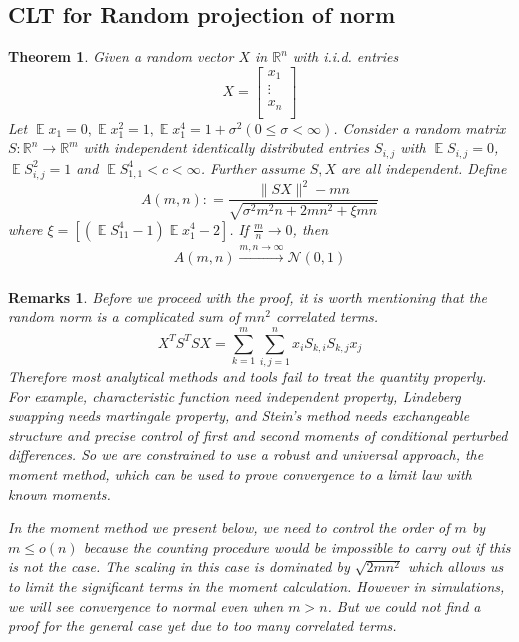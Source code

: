 \documentclass[12pt]{extarticle}
\newtheorem{theorem}{Theorem}
\newtheorem*{remark*}{Remarks}
\newcommand{\cN}{{\mathcal{N}}}
\newcommand{\field}[1]{\mathbb{#1}}
\newcommand{\R}{\field{R}}
\newcommand{\1}{\field{1}}
\DeclareMathOperator{\E}{\mathbb{E}}
\newcommand{\mat}[2][rrrrrrrrrrrrrrrrrrrrrrrrrrrrrrrr]{\left[ \begin{array}{#1} #2 \\ \end{array}\right]}
\numberwithin{equation}{section}
\begin{document}
\subsection{CLT for Random projection of norm}
\begin{theorem}
\label{thm:rand_proj norm CLT}
Given a random vector $X$ in $\R^n$ with i.i.d. entries
$$X=\mat[c]{x_1\\ \vdots\\ x_n}$$
Let $\E x_1=0, \E x_1^2=1, \E x_1^4 =1+\sigma^2 (0\le \sigma <\infty)$.
Consider a  random  matrix $S: \R^n \to \R^m$ with independent identically distributed entries $S_{i,j}$ with $ \E S_{i,j} = 0$,  $ \E S_{i,j}^2 = 1$ and $\E S_{1,1}^4<c<\infty$.
Further assume $S,X$ are all independent.
Define 
\[
    A(m,n): =\frac{\|SX\|^2 - mn}{\sqrt{\sigma^2 m^2n+2mn^2+ \xi mn}}
\]
where $\xi=[(\E S_{11}^4-1)\E x_1^4 -2]$. If $\frac{m}{n} \to 0$, then
\begin{align}
 A(m,n)\xrightarrow[]{m,n \to \infty} \cN(0,1) \label{eqn:rand_proj norm CLT}
\end{align}

\end{theorem}
\begin{remark*}
Before we proceed with the proof, it is worth mentioning that the random norm is a complicated sum of $mn^2$ correlated terms.
\[
X^TS^TSX = \sum_{k=1}^m\sum_{i,j=1}^n x_i S_{k,i} S_{k,j}x_j
\]
Therefore most analytical methods and tools fail to treat the quantity properly. For example,  characteristic function need independent property, Lindeberg swapping needs martingale property, and Stein's method needs exchangeable structure and precise control of first and second moments of conditional perturbed differences. So we are constrained to use a robust and universal approach, the moment method, which can be used to prove convergence to a limit law with known moments.

In the moment method we present below, we need to control the order of $m$ by $m \le o(n)$ because the counting procedure would be impossible to carry out if this is not the case. The scaling in this case is dominated by $\sqrt{2mn^2}$ which allows us to limit the significant terms in the moment calculation. However in simulations, we will see convergence to normal even when $m> n$. But we could not find a proof for the general case yet due to too many correlated terms. 
\end{remark*}
\end{document}
